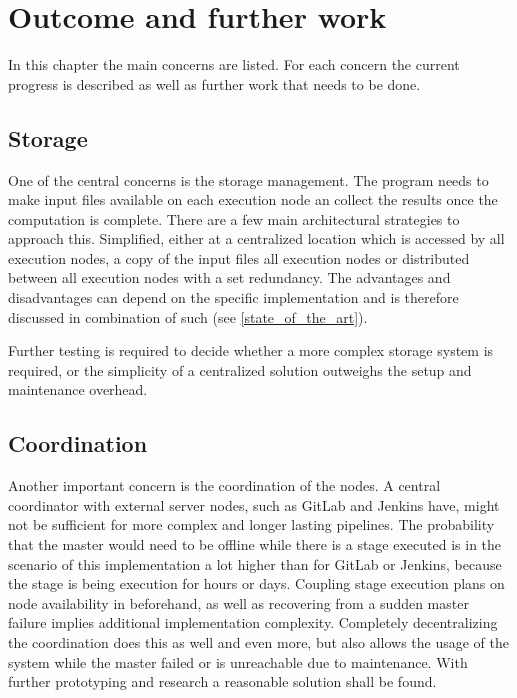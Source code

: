 \chapter{Outcome and further work}

In this chapter the main concerns are listed.
For each concern the current progress is described as well as further work that needs to be done.

\section{Storage}

One of the central concerns is the storage management.
The program needs to make input files available on each execution node an collect the results once the computation is complete.
There are a few main architectural strategies to approach this.
Simplified, either at a centralized location which is accessed by all execution nodes, a copy of the input files all execution nodes or distributed between all execution nodes with a set redundancy.
The advantages and disadvantages can depend on the specific implementation and is therefore discussed in combination of such (see \autoref{state_of_the_art}).

Further testing is required to decide whether a more complex storage system is required, or the simplicity of a centralized solution outweighs the setup and maintenance overhead.


%

\section{Coordination}

Another important concern is the coordination of the nodes.
A central coordinator with external server nodes, such as GitLab and Jenkins have, might not be sufficient for more complex and longer lasting pipelines.
The probability that the master would need to be offline while there is a stage executed is in the scenario of this implementation a lot higher than for GitLab or Jenkins, because the stage is being execution for hours or days.
Coupling stage execution plans on node availability in beforehand, as well as recovering from a sudden master failure implies additional implementation complexity.
Completely decentralizing the coordination does this as well and even more, but also allows the usage of the system while the master failed or is unreachable due to maintenance.
With further prototyping and research a reasonable solution shall be found.

